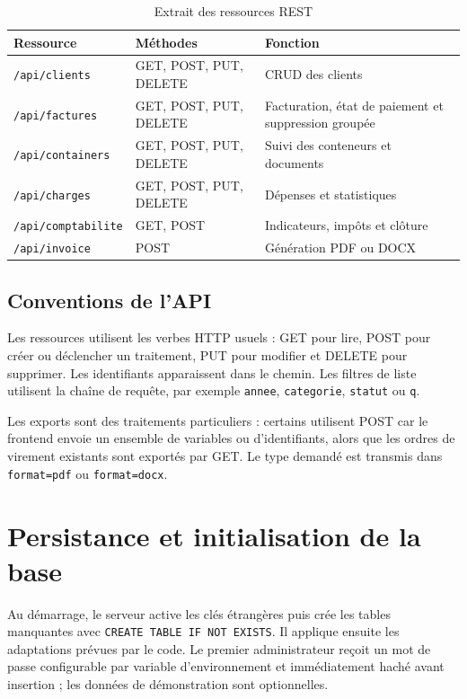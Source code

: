 \documentclass[12pt,a4paper,oneside]{report}
\newcommand{\code}[1]{\texttt{#1}}
\begin{document}
\begin{table}[H]\centering
\caption{Extrait des ressources REST}
\begin{tabularx}{\textwidth}{p{3.2cm}p{3.5cm}Y}
\toprule \textbf{Ressource} & \textbf{Méthodes} & \textbf{Fonction}\\ \midrule
\code{/api/clients} & GET, POST, PUT, DELETE & CRUD des clients\\
\code{/api/factures} & GET, POST, PUT, DELETE & Facturation, état de paiement et suppression groupée\\
\code{/api/containers} & GET, POST, PUT, DELETE & Suivi des conteneurs et documents\\
\code{/api/charges} & GET, POST, PUT, DELETE & Dépenses et statistiques\\
\code{/api/comptabilite} & GET, POST & Indicateurs, impôts et clôture\\
\code{/api/invoice} & POST & Génération PDF ou DOCX\\
\bottomrule
\end{tabularx}
\end{table}

\subsection{Conventions de l'API}
Les ressources utilisent les verbes HTTP usuels : GET pour lire, POST pour créer ou déclencher un traitement, PUT pour modifier et DELETE pour supprimer. Les identifiants apparaissent dans le chemin. Les filtres de liste utilisent la chaîne de requête, par exemple \code{annee}, \code{categorie}, \code{statut} ou \code{q}.

Les exports sont des traitements particuliers : certains utilisent POST car le frontend envoie un ensemble de variables ou d'identifiants, alors que les ordres de virement existants sont exportés par GET. Le type demandé est transmis dans \code{format=pdf} ou \code{format=docx}.

\section{Persistance et initialisation de la base}
Au démarrage, le serveur active les clés étrangères puis crée les tables manquantes avec \code{CREATE TABLE IF NOT EXISTS}. Il applique ensuite les adaptations prévues par le code. Le premier administrateur reçoit un mot de passe configurable par variable d'environnement et immédiatement haché avant insertion ; les données de démonstration sont optionnelles.
\end{document}
